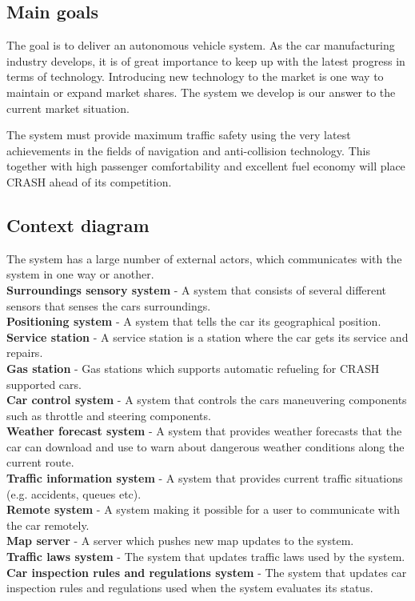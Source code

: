 \documentclass{article}
\begin{document}
\subsection{Main goals}
\noindent The goal is to deliver an autonomous vehicle system. As the car manufacturing industry develops, it is of great importance to keep up with the latest progress in terms of technology. Introducing new technology to the market is one way to maintain or expand market shares. The system we develop is our answer to the current market situation.

The system must provide maximum traffic safety using the very latest achievements in the fields of navigation and anti-collision technology. This together with high passenger comfortability and excellent fuel economy will place CRASH ahead of its competition.

\subsection{Context diagram}
\noindent The system has a large number of external actors, which communicates with the system in one way or another. \\

\noindent
\noindent\textbf{Surroundings sensory system} - A system that consists of several different sensors that senses the cars surroundings.  \\
\textbf{Positioning system} - A system that tells the car its geographical position. \\
\textbf{Service station} - A service station is a station where the car gets its service and repairs.\\
\textbf{Gas station} - Gas stations which supports automatic refueling for CRASH supported cars.\\
\textbf{Car control system} - A system that controls the cars maneuvering components such as throttle and steering components. \\
\textbf{Weather forecast system} - A system that provides weather forecasts that the car can download and use to warn about dangerous weather conditions along the current route.  \\
\textbf{Traffic information system} - A system that provides current traffic situations (e.g. accidents, queues etc). \\
\textbf{Remote system} - A system making it possible for a user to communicate with the car remotely.\\
\textbf{Map server} - A server which pushes new map updates to the system. \\
\textbf{Traffic laws system} - The system that updates traffic laws used by the system.\\
\textbf{Car inspection rules and regulations system} - The system that updates car inspection rules and regulations used when the system evaluates its status. \\
\end{document}
